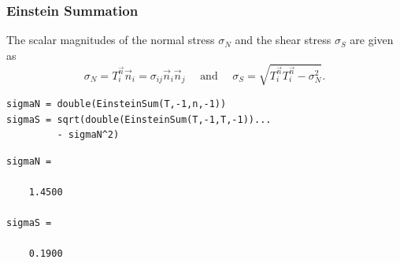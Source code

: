 \documentclass[compress]{beamer}
\begin{document}
\begin{frame}[fragile]
  \frametitle{Einstein Summation}

  The scalar magnitudes of the normal stress $\sigma_{N}$ and the shear stress
  $\sigma_{S}$ are given as
  \begin{equation*}
    \sigma_{N} = T^{\vec n}_{i} \vec n_{i} = \sigma_{ij} \vec n_{i}\vec n_{j}
    \quad \text{ and } \quad
    \sigma_{S} =\sqrt{T^{\vec n}_{i}T^{\vec n}_{i} - \sigma^{2}_{N} }.
  \end{equation*}

  \medskip
  \pause

\begin{lstlisting}[style=input]
sigmaN = double(EinsteinSum(T,-1,n,-1))
sigmaS = sqrt(double(EinsteinSum(T,-1,T,-1))...
         - sigmaN^2)
\end{lstlisting}
\vspace{-.3cm}
\begin{lstlisting}[style=output]
sigmaN =

    1.4500

sigmaS =

    0.1900
\end{lstlisting}

\end{frame}
\end{document}
